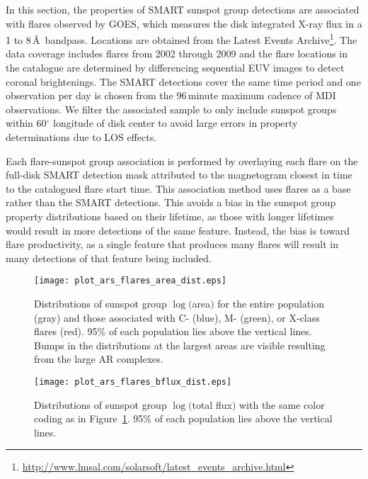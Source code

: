 In this section, the properties of \gls{SMART} sunspot group detections are associated with flares observed by \gls{GOES}, which measures the disk integrated X-ray flux in a 1 to 8\,\AA\ bandpass. Locations are obtained from the Latest Events Archive\footnote{\url{http://www.lmsal.com/solarsoft/latest\_events\_archive.html}}. The data coverage includes flares from 2002 through 2009 and the flare locations in the catalogue are determined by differencing sequential \gls{EUV} images to detect coronal brightenings. The \gls{SMART} detections cover the same time period and one observation per day is chosen from the 96\,minute maximum cadence of \gls{MDI} observations. We filter the associated sample to only include sunspot groups within 60$^\circ$ longitude of disk center to avoid large errors in property determinations due to \gls{LOS} effects.

Each flare-sunspot group association is performed by overlaying each flare on the full-disk \gls{SMART} detection mask attributed to the magnetogram closest in time to the catalogued flare start time. This association method uses flares as a base rather than the \gls{SMART} detections. This avoids a bias in the sunspot group property distributions based on their lifetime, as those with longer lifetimes would result in more detections of the same feature. Instead, the  bias is toward flare productivity, as a single feature that produces many flares will result in many detections of that feature being included. 

\begin{figure}[!t]
\centerline{\texttt{[image: plot\_ars\_flares\_area\_dist.eps]}}
\caption[Flaring AR area distributions.]{Distributions of sunspot group $\log($area$)$ for the entire population (gray) and those associated with C- (blue), M- (green), or X-class flares (red). 95\% of each population lies above the vertical lines. Bumps in the distributions at the largest areas are visible resulting from the large AR complexes.}
\label{fig:minareaflr}
\end{figure}

\begin{figure}[!t]
\centerline{\texttt{[image: plot\_ars\_flares\_bflux\_dist.eps]}}
\caption[Flaring AR flux distributions.]{Distributions of sunspot group $\log($total flux$)$ with the same color coding as in Figure~\ref{fig:minareaflr}. 95\% of each population lies above the vertical lines.}
\label{fig:minfluxflr}
\end{figure}

